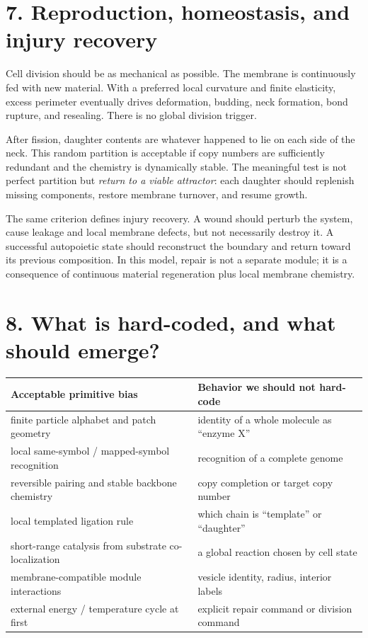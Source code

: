 \documentclass[10pt,a4paper]{article}
\begin{document}
\section{7. Reproduction, homeostasis, and injury recovery}

Cell division should be as mechanical as possible. The membrane is continuously fed with new material. With a preferred local curvature and finite elasticity, excess perimeter eventually drives deformation, budding, neck formation, bond rupture, and resealing. There is no global division trigger.

After fission, daughter contents are whatever happened to lie on each side of the neck. This random partition is acceptable if copy numbers are sufficiently redundant and the chemistry is dynamically stable. The meaningful test is not perfect partition but \emph{return to a viable attractor}: each daughter should replenish missing components, restore membrane turnover, and resume growth.

The same criterion defines injury recovery. A wound should perturb the system, cause leakage and local membrane defects, but not necessarily destroy it. A successful autopoietic state should reconstruct the boundary and return toward its previous composition. In this model, repair is not a separate module; it is a consequence of continuous material regeneration plus local membrane chemistry.

\section{8. What is hard-coded, and what should emerge?}

\begin{tabularx}{\textwidth}{@{}X X@{}}
\toprule
\textbf{Acceptable primitive bias} & \textbf{Behavior we should not hard-code} \\
\midrule
finite particle alphabet and patch geometry & identity of a whole molecule as ``enzyme X'' \\
local same-symbol / mapped-symbol recognition & recognition of a complete genome \\
reversible pairing and stable backbone chemistry & copy completion or target copy number \\
local templated ligation rule & which chain is ``template'' or ``daughter'' \\
short-range catalysis from substrate co-localization & a global reaction chosen by cell state \\
membrane-compatible module interactions & vesicle identity, radius, interior labels \\
external energy / temperature cycle at first & explicit repair command or division command \\
\bottomrule
\end{tabularx}
\end{document}
